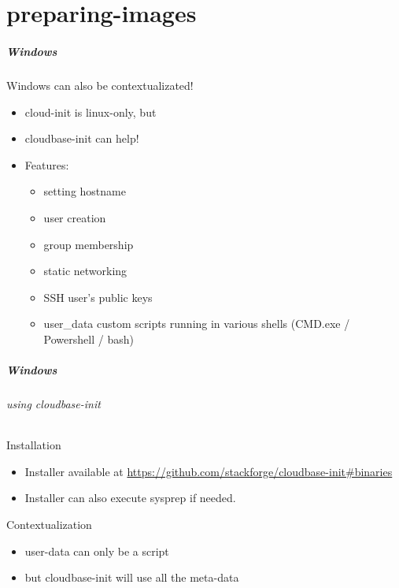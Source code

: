 \part{preparing-images}

\begin{frame}
  \frametitle{Windows}

  \begin{block}{Windows can also be contextualizated!}
  \begin{itemize}
    \item cloud-init is linux-only, but
    \item cloudbase-init can help!
    \item Features:
    \begin{itemize}
        \item setting hostname 
        \item user creation
        \item group membership
        \item static networking
        \item SSH user's public keys
        \item user\_data custom scripts running in various shells (CMD.exe / Powershell / bash)
    \end{itemize}
  \end{itemize}
  \end{block}
\end{frame}



\begin{frame}[fragile]
  \frametitle{Windows}
  \framesubtitle{using cloudbase-init}
    
  \begin{block}{Installation}
    \begin{itemize}
        \item Installer available at \url{https://github.com/stackforge/cloudbase-init\#binaries}
        \item Installer can also execute sysprep if needed.
    \end{itemize}
  \end{block}

  \begin{block}{Contextualization}
    \begin{itemize}
        \item user-data can only be a script 
        \item but cloudbase-init will use all the meta-data 
    \end{itemize}
  \end{block}

\end{frame}

